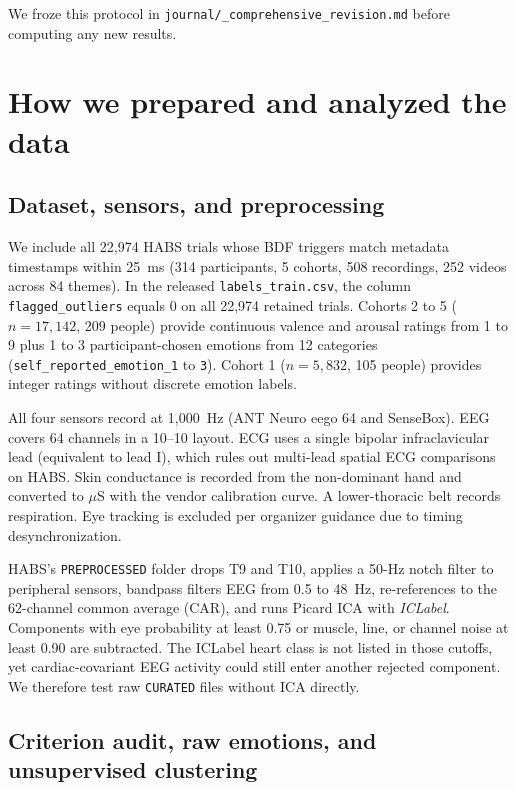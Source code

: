 \documentclass[10pt]{article}
\begin{document}
We froze this protocol in \texttt{journal/\_comprehensive\_revision.md} before computing any new results.

\section{How we prepared and analyzed the data}

\subsection{Dataset, sensors, and preprocessing}

We include all 22,974 HABS trials whose BDF triggers match metadata timestamps within 25~ms (314 participants, 5 cohorts, 508 recordings, 252 videos across 84 themes). In the released \texttt{labels\_train.csv}, the column \texttt{flagged\_outliers} equals 0 on all 22,974 retained trials. Cohorts 2 to 5 ($n = 17,142$, 209 people) provide continuous valence and arousal ratings from 1 to 9 plus 1 to 3 participant-chosen emotions from 12 categories (\texttt{self\_reported\_emotion\_1} to \texttt{3}). Cohort 1 ($n = 5,832$, 105 people) provides integer ratings without discrete emotion labels.

All four sensors record at 1,000~Hz (ANT Neuro eego 64 and SenseBox). EEG covers 64 channels in a 10--10 layout. ECG uses a single bipolar infraclavicular lead (equivalent to lead I), which rules out multi-lead spatial ECG comparisons on HABS. Skin conductance is recorded from the non-dominant hand and converted to $\mu$S with the vendor calibration curve. A lower-thoracic belt records respiration. Eye tracking is excluded per organizer guidance due to timing desynchronization.

HABS's \texttt{PREPROCESSED} folder drops T9 and T10, applies a 50-Hz notch filter to peripheral sensors, bandpass filters EEG from 0.5 to 48~Hz, re-references to the 62-channel common average (CAR), and runs Picard ICA with \emph{ICLabel}. Components with eye probability at least 0.75 or muscle, line, or channel noise at least 0.90 are subtracted. The ICLabel heart class is not listed in those cutoffs, yet cardiac-covariant EEG activity could still enter another rejected component. We therefore test raw \texttt{CURATED} files without ICA directly.

\subsection{Criterion audit, raw emotions, and unsupervised clustering}
\end{document}
